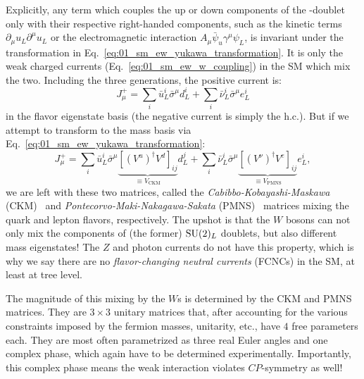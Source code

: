 Explicitly, any term which couples the up or down components of the \SU[2]-doublet only with their respective right-handed components, such as the kinetic terms $\partial_\mu u_L \partial^\mu u_L$ or the electromagnetic interaction $A_\mu \bar \psi_u \gamma^\mu \psi_L$, is invariant under the transformation in Eq.~\ref{eq:01_sm_ew_yukawa_transformation}.
It is only the weak charged currents (Eq.~\ref{eq:01_sm_ew_w_coupling}) in the SM which mix the two.
Including the three generations, the positive current is:
\begin{equation}
	\label{eq:01_sm_ew_flavor_jmu}
	J^+_\mu = \sum_i \bar u^i_L \bar \sigma^\mu d^i_L + \sum_i \bar \nu^i_L \bar \sigma^\mu e^i_L
\end{equation}
in the flavor eigenstate basis (the negative current is simply the h.c.).
But if we attempt to transform to the mass basis via Eq.~\ref{eq:01_sm_ew_yukawa_transformation}:
\begin{equation}
	\label{eq:01_sm_ew_flavor_jmu_ckm}
	J^+_\mu = \sum_i \bar u^i_L \bar \sigma^\mu \underbrace{[(V^u)^\dagger V^d]_{ij}}_{\equiv V_\mathrm{CKM}} d^j_L + \sum_i \bar \nu^i_L \bar \sigma^\mu \underbrace{[(V^\nu)^\dagger V^e]_{ij}}_{\equiv V_\mathrm{PMNS}} e^i_L,
\end{equation}
we are left with these two matrices, called the \textit{Cabibbo-Kobayashi-Maskawa} (CKM)~\cite{Kobayashi:1973fv} and \textit{Pontecorvo-Maki-Nakagawa-Sakata} (PMNS)~\cite{Maki:1962mu} matrices mixing the quark and lepton flavors, respectively.
The upshot is that the $W$ bosons can not only mix the components of (the former) $\SU[2]_L$ doublets, but also different mass eigenstates!
The $Z$ and photon currents do not have this property, which is why we say there are no \textit{flavor-changing neutral currents} (FCNCs) in the SM, at least at tree level.

The magnitude of this mixing by the $W$s is determined by the CKM and PMNS matrices.
They are $3 \times 3$ unitary matrices that, after accounting for the various constraints imposed by the fermion masses, unitarity, etc., have $4$ free parameters each.
They are most often parametrized as three real Euler angles and one complex phase, which again have to be determined experimentally.
Importantly, this complex phase means the weak interaction violates $CP$-symmetry as well!

